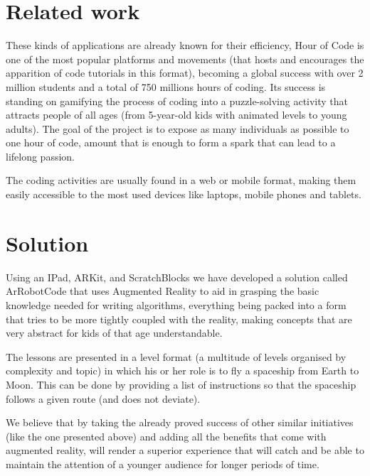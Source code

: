 \documentclass[12 pct]{report}
\begin{document}
\section{Related work}
These kinds of applications are already known for their efficiency, Hour of Code is one of the most popular platforms and movements (that hosts and encourages the apparition of code tutorials in this format), becoming a global success with over 2 million students and a total of 750 millions hours of coding. Its success is standing on gamifying the process of coding into a puzzle-solving activity that attracts people of all ages (from 5-year-old kids with animated levels to young adults). The goal of the project is to expose as many individuals as possible to one hour of code, amount that is enough to form a spark that can lead to a lifelong passion.

The coding  activities are usually found in a web or mobile format, making them easily accessible to the most used devices like laptops, mobile phones and tablets.

\section{Solution}
Using an IPad, ARKit, and ScratchBlocks we have developed a solution called ArRobotCode that uses Augmented Reality to aid in grasping the basic knowledge needed for writing algorithms, everything being packed into a form that tries to be more tightly coupled with the reality, making concepts that are very abstract for kids of that age understandable.

The lessons are presented in a level format (a multitude of levels organised by complexity and topic) in which his or her role is to fly a spaceship from Earth to Moon. This can be done by providing a list of instructions so that the spaceship follows a given route (and does not deviate).

We believe that by taking the already proved success of other similar initiatives (like the one presented above) and adding all the benefits that come with augmented reality, will render a superior experience that will catch and be able to maintain the attention of a younger audience for longer periods of time.
\end{document}
